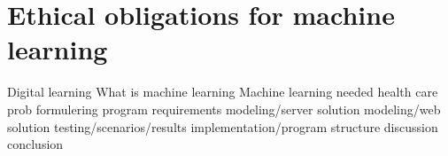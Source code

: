 \section{Ethical obligations for machine learning}\label{ch:ethical_obligations_ch}


Digital learning
What is machine learning
Machine learning needed health care 
prob formulering
program requirements
modeling/server solution
modeling/web solution
testing/scenarios/results
implementation/program structure
discussion
conclusion